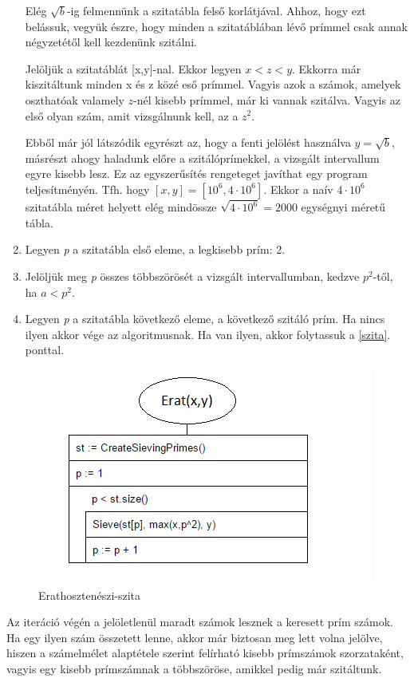\documentclass[twoside, a4paper, 12pt]{article}
\begin{document}
\begin{enumerate}
Elég $\sqrt{b}$-ig felmennünk a szitatábla felső korlátjával. Ahhoz, hogy ezt belássuk, vegyük észre, hogy minden a szitatáblában lévő prímmel csak annak négyzetétől kell kezdenünk szitálni. \par 
Jelöljük a szitatáblát [x,y]-nal. Ekkor legyen $x < z < y$. Ekkorra már kiszitáltunk minden x és z közé eső prímmel. Vagyis azok a számok, amelyek oszthatóak valamely $z$-nél kisebb prímmel, már ki vannak szitálva. Vagyis az első olyan szám, amit vizsgálnunk kell, az a $z^2$. \par
Ebből már jól látszódik egyrészt az, hogy a fenti jelölést használva $y=\sqrt{b}$, másrészt ahogy haladunk előre a szitálóprímekkel, a vizsgált intervallum egyre kisebb lesz. Ez az egyszerűsítés rengeteget javíthat egy program teljesítményén. Tfh. hogy $[x,y]=[10^6,4\cdot10^6]$. Ekkor a naív $4\cdot10^6$ szitatábla méret helyett elég mindössze $\sqrt{4\cdot10^6}=2000$ egységnyi méretű tábla.
\item Legyen \textit{p} a szitatábla első eleme, a legkisebb prím: 2.
\item Jelöljük meg \textit{p} összes többszörösét a vizsgált intervallumban, kedzve $p^2$-től, ha $a<p^2 $. \label{szita}
\item Legyen \textit{p} a szitatábla következő eleme, a következő szitáló prím. Ha nincs ilyen akkor vége az algoritmusnak. Ha van ilyen, akkor folytassuk a \ref{szita}. ponttal.
\end{enumerate}

\begin{figure}[h]
\centering
\includegraphics{img/erat_stuki.png}
\caption{Erathosztenészi-szita}
\end{figure}

\bigskip
Az iteráció végén a jelöletlenül maradt számok lesznek a keresett prím számok. Ha egy ilyen szám összetett lenne, akkor már biztosan meg lett volna jelölve, hiszen a számelmélet alaptétele szerint felírható kisebb prímszámok szorzataként, vagyis egy kisebb prímszámnak a többszöröse, amikkel pedig már szitáltunk.
\end{document}
